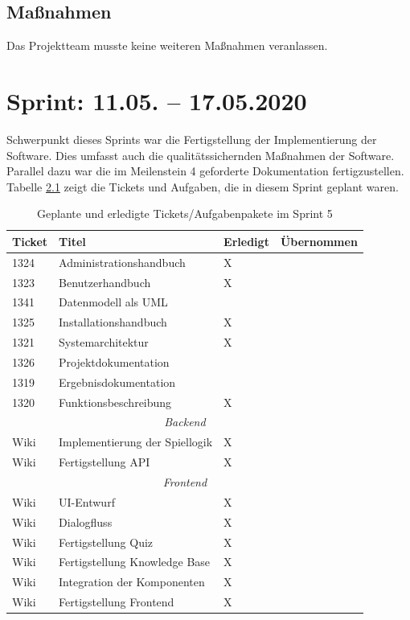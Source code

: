 \documentclass[a4paper,11pt,listof=numbered,glossary=totoc,parskip=half,toc=bib]{scrreprt}
\begin{document}
    \section{Maßnahmen}
    Das Projektteam musste keine weiteren Maßnahmen veranlassen.
    
    \chapter{Sprint: 11.05. – 17.05.2020}
 Schwerpunkt dieses Sprints war die Fertigstellung der Implementierung der Software. Dies umfasst auch die qualitätssichernden Maßnahmen der Software. Parallel dazu war die im Meilenstein 4 geforderte Dokumentation fertigzustellen. Tabelle \ref{tab:sprint5} zeigt die Tickets und Aufgaben, die in diesem Sprint geplant waren.
  
 \begin{table}   
    \begin{tabularx}{\textwidth}{lXll}
			\toprule
			\textbf{Ticket} & \textbf{Titel} & \textbf{Erledigt} & \textbf{Übernommen} \\
			\midrule
1324	&	Administrationshandbuch	&	X	&		\\
1323	&	Benutzerhandbuch	&	X	&		\\
1341	&	Datenmodell als UML	&		&		\\
1325	&	Installationshandbuch	&	X	&		\\
1321	&	Systemarchitektur	&	X	&		\\
1326	&	Projektdokumentation	&		&		\\
1319	&	Ergebnisdokumentation	&		&		\\
1320	&	Funktionsbeschreibung	&	X	&		\\

					\midrule
		\multicolumn{4}{c}{\textit{Backend}}\\
		\midrule
Wiki	&	Implementierung der Spiellogik	&	X	&		\\
Wiki	&	Fertigstellung API	&	X	&		\\
		\midrule
		\multicolumn{4}{c}{\textit{Frontend}}\\
		\midrule
Wiki	&	UI-Entwurf	&	X	&		\\
Wiki	&	Dialogfluss	&	X	&		\\
Wiki	&	Fertigstellung Quiz	&	X	&		\\
Wiki	&	Fertigstellung Knowledge Base	&	X	&		\\
Wiki	&	Integration der Komponenten	&	X	&		\\
Wiki	&	Fertigstellung Frontend	&	X	&		\\

			\bottomrule
		\end{tabularx}
\caption{Geplante und erledigte Tickets/Aufgabenpakete im Sprint 5}
\label{tab:sprint5}
\end{table}
    
\end{document}
